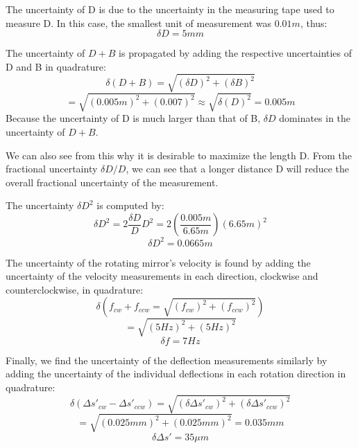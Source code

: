 \documentclass[twocolumn]{article}
\begin{document}
		The uncertainty of D is due to the uncertainty in the measuring tape used to measure D.
		In this case, the smallest unit of measurement was $0.01m$, thus:
		\begin{equation}
			\delta D = 5mm
		\end{equation}
		
		The uncertainty of $D + B$ is propagated by adding the respective uncertainties of D and B in quadrature:
		\begin{equation*}
			\delta (D+B) = \sqrt{(\delta D)^2 + (\delta B)^2}
		\end{equation*}
		\begin{equation*}
		= \sqrt{(0.005m)^2 + (0.007)^2} \approx \sqrt{\delta \left(D\right)^2} = 0.005m
		\end{equation*}
		Because the uncertainty of D is much larger than that of B, $\delta D$ dominates in the uncertainty of $D + B$.
		
		We can also see from this why it is desirable to maximize the length D.
		From the fractional uncertainty $\delta D/D$, we can see that a longer distance D will reduce the overall fractional uncertainty of the measurement.
		
		The uncertainty $\delta D^2$ is computed by:
		\begin{equation*}
			\delta D^2 = 2 \frac{\delta D}{D} D^2 = 2(\frac{0.005m}{6.65m}) (6.65m)^2 
		\end{equation*}
		\begin{equation}
		\delta D^2 = 0.0665m
		\end{equation}
		
		The uncertainty of the rotating mirror's velocity is found by adding the uncertainty of the velocity measurements in each direction, clockwise and counterclockwise, in quadrature:
		\begin{equation}
			\delta (f_{cw} + f_{ccw} = \sqrt{(f_{cw})^2 + (f_{ccw})^2}) 
		\end{equation}
		\begin{equation*}
			= \sqrt{(5Hz)^2 + (5Hz)^2}
		\end{equation*}
		\begin{equation}
			\delta f = 7Hz
		\end{equation}
		
		Finally, we find the uncertainty of the deflection measurements similarly by adding the uncertainty of the individual deflections in each rotation direction in quadrature:
		\begin{equation*}
			\delta(\Delta s'_{cw} - \Delta s'_{ccw}) = \sqrt{(\delta \Delta s'_{cw})^2 + (\delta \Delta s'_{ccw})^2}
		\end{equation*}
		\begin{equation*}
			= \sqrt{(0.025mm)^2 + (0.025mm)^2} = 0.035 mm
		\end{equation*}
		\begin{equation}
			\delta \Delta s' = 35\mu m
		\end{equation}
		
\end{document}

